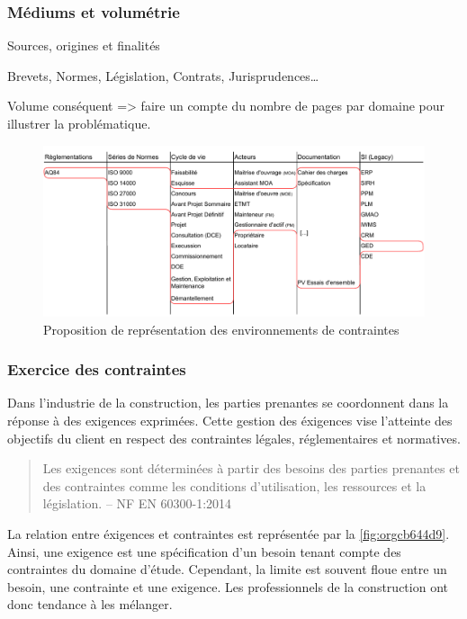 \documentclass[a4paper,12pt]{article}
\begin{document}
\subsubsection{Médiums et volumétrie}
\label{sec:org6758251}
Sources, origines et finalités

Brevets, Normes, Législation, Contrats, Jurisprudences\ldots{}

Volume conséquent => faire un compte du nombre de pages par domaine pour illustrer la problématique.

\begin{figure}[htbp]
\centering
\includegraphics[width=.9\linewidth]{./svg/360-view-engineering-environment.pdf}
\caption{\label{fig:org54ac1f0}Proposition de représentation des environnements de contraintes}
\end{figure}
\subsubsection{Exercice des contraintes}
\label{sec:orgae6cfc0}
Dans l'industrie de la construction, les parties prenantes se coordonnent dans la réponse à des exigences exprimées. Cette gestion des éxigences vise l'atteinte des objectifs du client en respect des contraintes légales, réglementaires et normatives.

\begin{quote}
Les exigences sont déterminées à partir des besoins des parties prenantes et des contraintes comme les conditions d’utilisation, les ressources et la législation. -- NF EN 60300-1:2014\autocite{GestionSureteFonctionnement2014}
\end{quote}

La relation entre éxigences et contraintes est représentée par la \ref{fig:orgcb644d9}. Ainsi, une exigence est une spécification d'un besoin tenant compte des contraintes du domaine d'étude. Cependant, la limite est souvent floue entre un besoin, une contrainte et une exigence. Les professionnels de la construction ont donc tendance à les mélanger.
\end{document}
